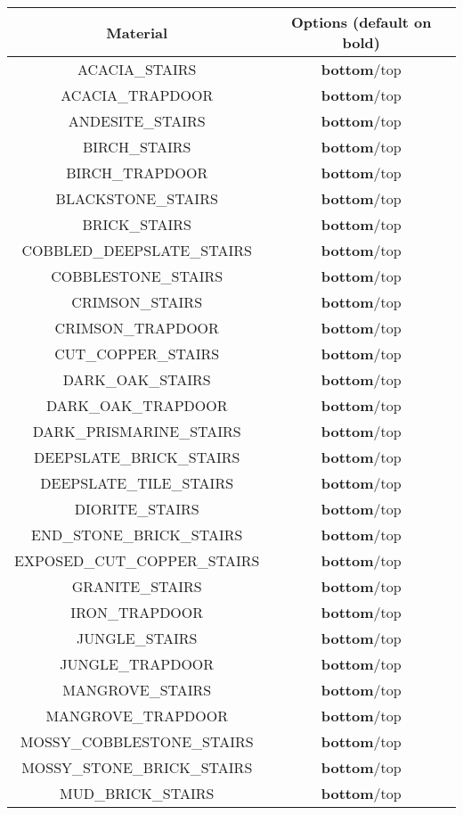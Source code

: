 \begin{longtable}{ |c|c| }
	\hline
	Material & Options (default on bold) \\
	\hline
	\endhead
	ACACIA\_STAIRS & \textbf{bottom}/top \\
	ACACIA\_TRAPDOOR & \textbf{bottom}/top \\
	ANDESITE\_STAIRS & \textbf{bottom}/top \\
	BIRCH\_STAIRS & \textbf{bottom}/top \\
	BIRCH\_TRAPDOOR & \textbf{bottom}/top \\
	BLACKSTONE\_STAIRS & \textbf{bottom}/top \\
	BRICK\_STAIRS & \textbf{bottom}/top \\
	COBBLED\_DEEPSLATE\_STAIRS & \textbf{bottom}/top \\
	COBBLESTONE\_STAIRS & \textbf{bottom}/top \\
	CRIMSON\_STAIRS & \textbf{bottom}/top \\
	CRIMSON\_TRAPDOOR & \textbf{bottom}/top \\
	CUT\_COPPER\_STAIRS & \textbf{bottom}/top \\
	DARK\_OAK\_STAIRS & \textbf{bottom}/top \\
	DARK\_OAK\_TRAPDOOR & \textbf{bottom}/top \\
	DARK\_PRISMARINE\_STAIRS & \textbf{bottom}/top \\
	DEEPSLATE\_BRICK\_STAIRS & \textbf{bottom}/top \\
	DEEPSLATE\_TILE\_STAIRS & \textbf{bottom}/top \\
	DIORITE\_STAIRS & \textbf{bottom}/top \\
	END\_STONE\_BRICK\_STAIRS & \textbf{bottom}/top \\
	EXPOSED\_CUT\_COPPER\_STAIRS & \textbf{bottom}/top \\
	GRANITE\_STAIRS & \textbf{bottom}/top \\
	IRON\_TRAPDOOR & \textbf{bottom}/top \\
	JUNGLE\_STAIRS & \textbf{bottom}/top \\
	JUNGLE\_TRAPDOOR & \textbf{bottom}/top \\
	MANGROVE\_STAIRS & \textbf{bottom}/top \\
	MANGROVE\_TRAPDOOR & \textbf{bottom}/top \\
	MOSSY\_COBBLESTONE\_STAIRS & \textbf{bottom}/top \\
	MOSSY\_STONE\_BRICK\_STAIRS & \textbf{bottom}/top \\
	MUD\_BRICK\_STAIRS & \textbf{bottom}/top \\

\end{longtable}
